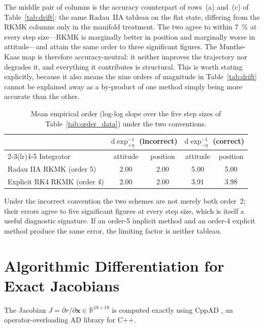 \documentclass[a4paper,10pt]{article}
\newcommand{\dexp}{\mathrm{d}\exp}
\newcommand{\R}{\mathbb{R}}
\theoremstyle{definition}
\begin{document}
The middle pair of columns is the accuracy counterpart of rows~(a) and~(c) of
Table~\ref{tab:drift}: the same Radau~IIA tableau on the flat state, differing
from the RKMK columns only in the manifold treatment.  The two agree to within
\SI{7}{\percent} at every step size---RKMK is marginally better in position and
marginally worse in attitude---and attain the same order to three significant
figures.  The Munthe-Kaas map is therefore accuracy-neutral: it neither
improves the trajectory nor degrades it, and everything it contributes is
structural.  This is worth stating explicitly, because it also means the nine
orders of magnitude in Table~\ref{tab:drift} cannot be explained away as a
by-product of one method simply being more accurate than the other.

\begin{table}[h]
  \centering
  \caption{Mean empirical order (log-log slope over the five step sizes of
    Table~\ref{tab:order_data}) under the two conventions.}
  \label{tab:order_summary}
  \small
  \begin{tabular}{lcccc}
    \toprule
    & \multicolumn{2}{c}{$\dexp^{-1}_{+\eta}$ (incorrect)} & \multicolumn{2}{c}{$\dexp^{-1}_{-\eta}$ (correct)} \\
    \cmidrule(lr){2-3}\cmidrule(lr){4-5}
    Integrator & attitude & position & attitude & position \\
    \midrule
    Radau IIA RKMK (order 5)    & 2.00 & 2.00 & 5.00 & 5.00 \\
    Explicit RK4 RKMK (order 4) & 2.00 & 2.00 & 3.91 & 3.98 \\
    \bottomrule
  \end{tabular}
\end{table}

Under the incorrect convention the two schemes are not merely both order~2;
their errors agree to five significant figures at every step size, which is
itself a useful diagnostic signature.  If an order-5 implicit method and an
order-4 explicit method produce the same error, the limiting factor is neither
tableau.

\section{Algorithmic Differentiation for Exact Jacobians}
\label{sec:ad}

The Jacobian $J = \partial r / \partial \mathbf{x} \in \R^{18\times18}$ is
computed exactly using CppAD \citep{cppad}, an operator-overloading AD library
for C++.
\end{document}
